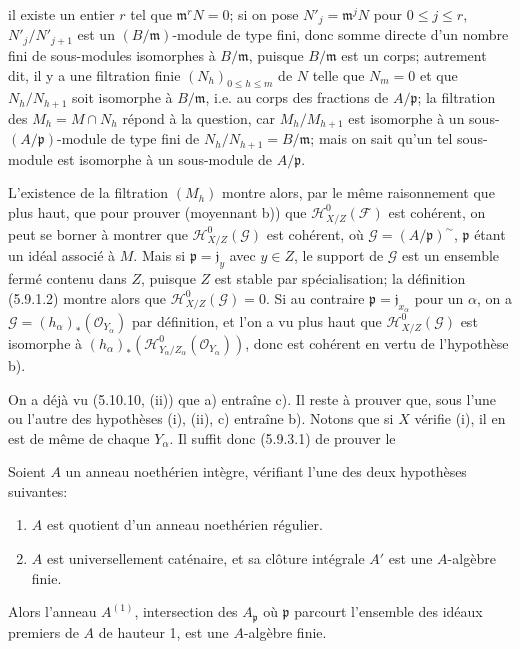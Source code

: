 
il existe un entier $r$ tel que $\mathfrak m^rN=0$; si on pose
$N'_j=\mathfrak m^jN$ pour $0\leq j\leq r$, $N'_j/N'_{j+1}$ est un
$(B/\mathfrak m)$-module de type fini, donc somme directe d'un nombre fini de
sous-modules isomorphes à $B/\mathfrak m$, puisque $B/\mathfrak m$ est un
corps; autrement dit, il y a une filtration finie $(N_h)_{0\leq h\leq m}$ de
$N$ telle que $N_m=0$ et que $N_h/N_{h+1}$ soit isomorphe à
$B/\mathfrak m$, i.e. au corps des fractions de $A/\mathfrak p$; la
filtration des $M_h=M\cap N_h$ répond à la question, car $M_h/M_{h+1}$ est
isomorphe à un sous-$(A/\mathfrak p)$-module de type fini de
$N_h/N_{h+1}=B/\mathfrak m$; mais on sait qu'un tel sous-module est isomorphe
à un sous-module de $A/\mathfrak p$.

L'existence de la filtration $(M_h)$ montre alors, par le même raisonnement que
plus haut, que pour prouver (moyennant b)) que
$\mathcal H^0_{X/Z}(\mathcal F)$ est cohérent, on peut se borner à montrer que
$\mathcal H^0_{X/Z}(\mathcal G)$ est cohérent, où
$\mathcal G=(A/\mathfrak p)^\sim$, $\mathfrak p$ étant un idéal associé à
$M$. Mais si $\mathfrak p=\mathfrak j_y$ avec $y\in Z$, le support de
$\mathcal G$ est un ensemble fermé contenu dans $Z$, puisque $Z$ est stable
par spécialisation; la définition (5.9.1.2) montre alors que
$\mathcal H^0_{X/Z}(\mathcal G)=0$. Si au contraire
$\mathfrak p=\mathfrak j_{x_\alpha}$ pour un $\alpha$, on a
$\mathcal G=(h_\alpha)_*(\mathcal O_{Y_\alpha})$ par définition, et l'on a vu
plus haut que $\mathcal H^0_{X/Z}(\mathcal G)$ est isomorphe à
$(h_\alpha)_*(\mathcal H^0_{Y_\alpha/Z_\alpha}(\mathcal O_{Y_\alpha}))$,
donc est cohérent en vertu de l'hypothèse b).

On a déjà vu (5.10.10, (ii)) que a) entraîne c). Il reste à prouver que, sous
l'une ou l'autre des hypothèses (i), (ii), c) entraîne b). Notons que si $X$
vérifie (i), il en est de même de chaque $Y_\alpha$. Il suffit donc (5.9.3.1)
de prouver le

\begin{corollary}[5.11.2]
\label{IV.2.s5.11.2-fr}
Soient $A$ un anneau noethérien intègre, vérifiant l'une des deux hypothèses
suivantes:
\begin{enumerate}
\item[(i)] $A$ est quotient d'un anneau noethérien régulier.
\item[(ii)] $A$ est universellement caténaire, et sa clôture intégrale $A'$ est
une $A$-algèbre finie.
\end{enumerate}
Alors l'anneau $A^{(1)}$, intersection des $A_\mathfrak p$ où $\mathfrak p$
parcourt l'ensemble des idéaux premiers de $A$ de hauteur 1, est une
$A$-algèbre finie.
\end{corollary}

